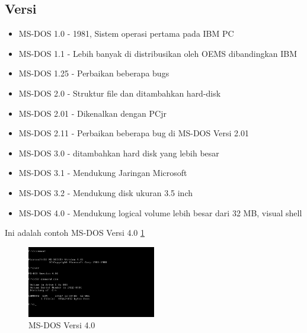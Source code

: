 		\subsection{Versi}
		\begin{itemize}
			\item MS-DOS 1.0 - 1981, Sistem operasi pertama pada IBM PC
			\item MS-DOS 1.1 - Lebih banyak di distribusikan oleh OEMS dibandingkan IBM
			\item MS-DOS 1.25 - Perbaikan beberapa bugs
			\item MS-DOS 2.0 - Struktur file dan ditambahkan hard-disk
			\item MS-DOS 2.01 - Dikenalkan dengan PCjr
			\item MS-DOS 2.11 - Perbaikan beberapa bug di MS-DOS Versi 2.01
			\item MS-DOS 3.0 - ditambahkan hard disk yang lebih besar
			\item MS-DOS 3.1 - Mendukung Jaringan Microsoft
			\item MS-DOS 3.2 - Mendukung disk ukuran 3.5 inch
			\item MS-DOS 4.0 - Mendukung logical volume lebih besar dari 32 MB, visual shell
		\end {itemize}
		
		\vspace{1cm} Ini adalah contoh MS-DOS Versi 4.0 \ref{dosv4}
		\begin{figure}[ht]
			\centerline{\includegraphics[width=0.5\textwidth]{figures/dosv4.png}}
			\caption{MS-DOS Versi 4.0}
			\label{dosv4}
			\end{figure}
		
